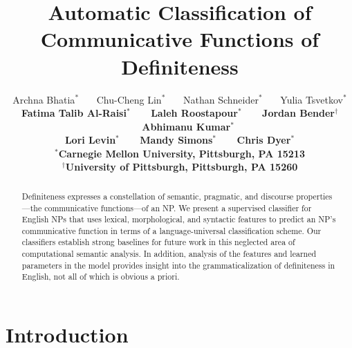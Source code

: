\documentclass[11pt,letterpaper]{article}
\title{Automatic Classification of Communicative Functions of Definiteness}
\author{Archna Bhatia$^\ast$ \ \ \ Chu-Cheng Lin$^\ast$ \ \ \ Nathan Schneider$^\ast$ \ \ \ Yulia Tsvetkov$^\ast$ \\
 \bf Fatima Talib Al-Raisi$^\ast$ \ \ \  Laleh Roostapour$^\ast$ \ \ \ Jordan Bender$^\dagger$  \ \ \ Abhimanu Kumar$^\ast$  \\
 \bf Lori Levin$^\ast$ \ \ \ Mandy Simons$^\ast$ \ \ \  Chris Dyer$^\ast$\\
$^\ast$Carnegie Mellon University, Pittsburgh, PA 15213\\
$^\dagger$University of Pittsburgh, Pittsburgh, PA 15260}
\date{}
\newcommand{\ensuretext}[1]{#1}
\newcommand{\abmarker}{\ensuretext{\textcolor{red}{\ensuremath{^{\textsc{A}}_{\textsc{B}}}}}}
\newcommand{\arkcomment}[3]{\ensuretext{\textcolor{#3}{[#1 #2]}}}
\newcommand{\ab}[1]{\arkcomment{\abmarker}{#1}{red}}
\begin{document}
\maketitle
\begin{abstract}
Definiteness expresses a constellation of semantic, pragmatic, and discourse properties---the communicative functions—of an NP. We present a supervised classifier for English NPs that uses lexical, morphological, and syntactic features to predict an NP's communicative function in terms of a language-universal classification scheme. Our classifiers establish strong baselines for future work in this neglected area of computational semantic analysis. In addition, analysis of the features and learned parameters 
in the model provides insight into the grammaticalization of definiteness in English, 
not all of which is obvious a priori.
\end{abstract}

\section{Introduction}
\end{document}
